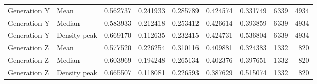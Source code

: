 \begin{tabular}{llrrrrrrr}
Generation Y & Mean & 0.562737 & 0.241933 & 0.285789 & 0.424574 & 0.331749 & 6339 & 4934 \\
Generation Y & Median & 0.583933 & 0.212418 & 0.253412 & 0.426614 & 0.393859 & 6339 & 4934 \\
Generation Y & Density peak & 0.669170 & 0.112635 & 0.232415 & 0.424731 & 0.536804 & 6339 & 4934 \\
Generation Z & Mean & 0.577520 & 0.226254 & 0.310116 & 0.409881 & 0.324383 & 1332 & 820 \\
Generation Z & Median & 0.603969 & 0.194248 & 0.265134 & 0.402376 & 0.397651 & 1332 & 820 \\
Generation Z & Density peak & 0.665507 & 0.118081 & 0.226593 & 0.387629 & 0.515074 & 1332 & 820 \\
\bottomrule
\end{tabular}
